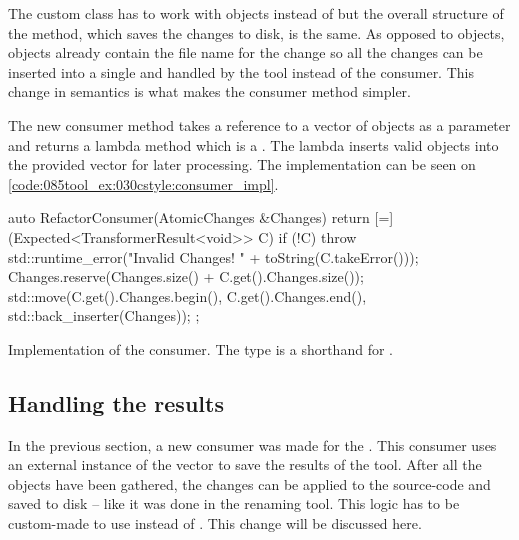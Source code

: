 The custom class has to work with  objects instead of  but the overall structure of the  method, which saves the changes to disk, is the same. As opposed to  objects,  objects already contain the file name for the change so all the changes can be inserted into a single  and handled by the tool instead of the consumer. This change in semantics is what makes the consumer method simpler. 

The new consumer method takes a reference to a vector of  objects as a parameter and returns a lambda method which is a . The lambda inserts valid  objects into the provided vector for later processing. The implementation can be seen on \cref{code:085tool_ex:030cstyle:consumer_impl}.

\begin{listing}[H]
    \begin{cppcode}
auto RefactorConsumer(AtomicChanges &Changes) {
        return [=](Expected<TransformerResult<void>> C) {
            if (!C) {
                throw std::runtime_error("Invalid Changes! " + toString(C.takeError()));
            }
            Changes.reserve(Changes.size() + C.get().Changes.size());
            std::move(C.get().Changes.begin(), C.get().Changes.end(), std::back_inserter(Changes));
        };
}
    \end{cppcode}
    \caption{Implementation of the  consumer. The  type is a shorthand for .}
    \label{code:085tool_ex:030cstyle:consumer_impl}
\end{listing}

\subsection{Handling the results}

In the previous section, a new consumer was made for the . This consumer uses an external instance of the vector to save the results of the tool. After all the  objects have been gathered, the changes can be applied to the source-code and saved to disk -- like it was done in the renaming tool. This logic has to be custom-made to use  instead of . This change will be discussed here.

